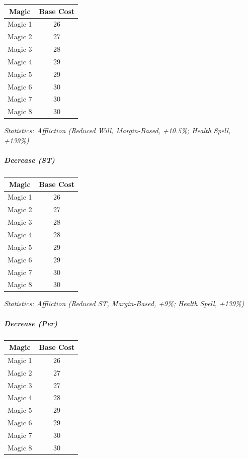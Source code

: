 \begin{multicols}{3}
		\begin{center}
		\begin{tabular}{|c|c|}
			\hline
			Magic & Base Cost \\
			\hline
			\hline
			Magic 1 & 26 \\
			Magic 2 & 27 \\
			Magic 3 & 28 \\
			Magic 4 & 29 \\
			Magic 5 & 29 \\
			Magic 6 & 30 \\
			Magic 7 & 30 \\
			Magic 8 & 30 \\
			\hline
		\end{tabular}
	\end{center}	
	
	\textcolor{OliveGreen}{\textit{Statistics: Affliction (Reduced Will, Margin-Based, +10.5\%; Health Spell, +139\%) }}
		
	\subparagraph{Decrease (ST)}
	
	\begin{center}
		\begin{tabular}{|c|c|}
			\hline
			Magic & Base Cost \\
			\hline
			\hline
			Magic 1 & 26 \\
			Magic 2 & 27 \\
			Magic 3 & 28 \\
			Magic 4 & 28 \\
			Magic 5 & 29 \\
			Magic 6 & 29 \\
			Magic 7 & 30 \\
			Magic 8 & 30 \\
			\hline
		\end{tabular}
	\end{center}	
	
	\textcolor{OliveGreen}{\textit{Statistics: Affliction (Reduced ST, Margin-Based, +9\%; Health Spell, +139\%) }}	
	
	\subparagraph{Decrease (Per)}
	
	\begin{center}
		\begin{tabular}{|c|c|}
			\hline
			Magic & Base Cost \\
			\hline
			\hline
			Magic 1 & 26 \\
			Magic 2 & 27 \\
			Magic 3 & 27 \\
			Magic 4 & 28 \\
			Magic 5 & 29 \\
			Magic 6 & 29 \\
			Magic 7 & 30 \\
			Magic 8 & 30 \\
			\hline
		\end{tabular}
	\end{center}	
	

\end{multicols}
